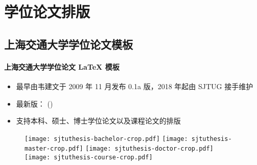
\section{学位论文排版}
\subsection{\SJTUThesis 上海交通大学学位论文模板}

\begin{frame}{\SJTUThesis}
  \framesubtitle{上海交通大学学位论文 \LaTeX{} 模板}
  \begin{itemize}
  \item 最早由韦建文于 2009 年 11 月发布 0.1a 版，2018 年起由 SJTUG 接手维护
  \item 最新版：\SJTUThesisVersion{} (\SJTUThesisDate)
  \item 支持本科、硕士、博士学位论文以及课程论文的排版
  \end{itemize}
  \begin{figure}[htbp]
    \centering
    \texttt{[image: sjtuthesis-bachelor-crop.pdf]}\hspace{6pt}
    \texttt{[image: sjtuthesis-master-crop.pdf]}\hspace{6pt}
    \texttt{[image: sjtuthesis-doctor-crop.pdf]}\hspace{6pt}
    \texttt{[image: sjtuthesis-course-crop.pdf]}
  \end{figure}
\end{frame}


